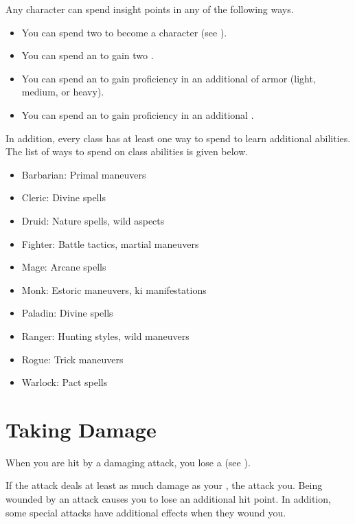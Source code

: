         Any character can spend insight points in any of the following ways.
        \begin{itemize}
            \item You can spend two  to become a  character (see ).
            \item You can spend an  to gain two .
            \item You can spend an  to gain proficiency in an additional  of armor (light, medium, or heavy).
            \item You can spend an  to gain proficiency in an additional .
        \end{itemize}
        In addition, every class has at least one way to spend  to learn additional abilities.
        The list of ways to spend  on class abilities is given below.
        \begin{itemize}
            \item Barbarian: Primal maneuvers
            \item Cleric: Divine spells
            \item Druid: Nature spells, wild aspects
            \item Fighter: Battle tactics, martial maneuvers
            \item Mage: Arcane spells
            \item Monk: Estoric maneuvers, ki manifestations
            \item Paladin: Divine spells
            \item Ranger: Hunting styles, wild maneuvers
            \item Rogue: Trick maneuvers
            \item Warlock: Pact spells
        \end{itemize}

\section{Taking Damage}\label{Taking Damage}

    When you are hit by a damaging attack, you lose a  (see ).

    If the attack deals at least as much damage as your , the attack  you.
    Being wounded by an attack causes you to lose an additional hit point.
    In addition, some special attacks have additional effects when they wound you.

